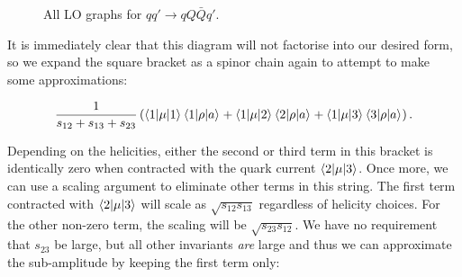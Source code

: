 \begin{figure}[H]
\caption{All LO graphs for $qq' \to qQ\bar{Q}q'$.}
\label{fig:qq_qQQq_graphs}
\end{figure}

It is immediately clear that this diagram will not factorise into our desired form, so we expand the square bracket as a spinor chain again to attempt to make some approximations:

\begin{equation}
\frac{1}{s_{12} + s_{13} + s_{23}} \left(\mathinner{\langle1\vert\mu\vert1\rangle}_{}\mathinner{\langle1\vert\rho\vert a\rangle}_{} + \mathinner{\langle1\vert\mu\vert2\rangle}_{} \mathinner{\langle2\vert\rho\vert a\rangle}_{} + \mathinner{\langle1\vert\mu\vert3\rangle}_{} \mathinner{\langle3\vert\rho\vert a\rangle}_{} \right).
\end{equation}

Depending on the helicities, either the second or third term in this bracket is identically zero when contracted with the quark current $\mathinner{\langle2\vert\mu\vert3\rangle}_{}$. Once more, we can use a scaling argument to eliminate other terms in this string. The first term contracted with $\mathinner{\langle2\vert\mu\vert3\rangle}_{}$ will scale as $\sqrt{s_{12} s_{13}}$ regardless of helicity choices. For the other non-zero term, the scaling will be $\sqrt{s_{23} s_{12}}$. We have no requirement that $s_{23}$ be large, but all other invariants \emph{are} large and thus we can approximate the sub-amplitude by keeping the first term only: 

